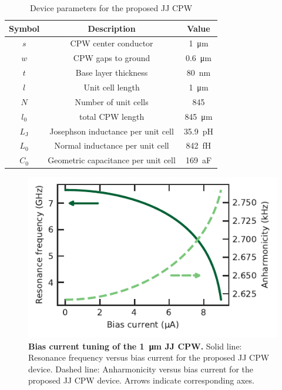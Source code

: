 \begin{table}
	\caption{Device parameters for the proposed JJ CPW\label{tab:arraygeometry}}
	\begin{tabular}{ccc}
		\hline \hline
		Symbol       & Description                           & Value                            \\
		\hline
		$s$          & CPW center conductor                  & \SI{1}{\micro\meter}            \\
		$w$          & CPW gaps to ground                    & \SI{0.6}{\micro\meter}             \\
		$t$          & Base layer thickness                  & \SI{80}{\nano\meter}             \\
		$l$          & Unit cell length                  & \SI{1}{\micro\meter}             \\
		$N$          & Number of unit cells                 & 845             \\
		$l_0$        & total CPW length   & \SI{845}{\micro\meter}          \\
		$L_\text{J}$ & Josephson inductance per unit cell         & \SI{35.9}{\pico\henry} \\
		$L_0$ & Normal inductance per unit cell         & \SI{842}{\femto\henry} \\
		$C_0$ & Geometric capacitance per unit cell      & \SI{169}{\atto\farad}  \\
		\hline\hline
	\end{tabular}
\end{table}

\begin{figure}
	\centering
	\includegraphics[width=.5\linewidth]{chapter-currentdetection/figures/SM_JJarrayCPW_vs_I}
	\caption{
		\textbf{Bias current tuning of the \SI{1}{\micro\meter} JJ CPW.}
		Solid line: Resonance frequency versus bias current for the proposed JJ CPW device.
		Dashed line: Anharmonicity versus bias current for the proposed JJ CPW device.
		Arrows indicate corresponding axes.
	}
	\label{fig:JJCPW-anh}
\end{figure}

